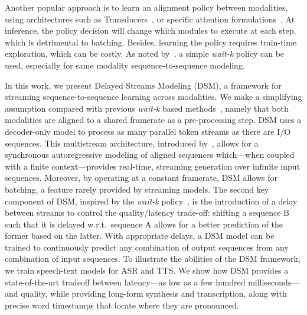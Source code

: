 \documentclass{article}
\begin{document}
Another popular approach is to learn an alignment policy between modalities, using architectures such as Transducers~\citep{graves2012sequence,zhang2020transformer}, or specific attention formulations~\citep{monotonic_attention,guo2024decoder}. 
At inference, the policy decision will change which modules to execute at each step, which is detrimental to batching. Besides, learning the policy requires train-time exploration, which can be costly. As noted by~\citet{ma-etal-2019-stacl}, a simple \emph{wait-k} policy can be used, especially for same modality sequence-to-sequence modeling.

In this work, we present Delayed Streams Modeling (DSM), a framework for streaming sequence-to-sequence learning across modalities. We make a simplifying assumption compared with previous \emph{wait-k} based methods~\citep{ma2021streaming,chen-etal-2021-direct}, namely that both modalities are aligned to a shared framerate as a pre-processing step.
DSM uses a decoder-only model to process as many parallel token streams as there are I/O sequences. This multistream architecture, introduced by~\citet{moshi}, allows for a synchronous autoregressive modeling of aligned sequences which---when coupled with a finite context---provides real-time, streaming generation over infinite input sequences. Moreover, by operating at a constant framerate, DSM allows for batching, a feature rarely provided by streaming models. The second key component of DSM, inspired by the \emph{wait-k} policy~\citep{ma-etal-2019-stacl}, is the introduction of a delay between streams to control the quality/latency trade-off: shifting a sequence B such that it is delayed w.r.t.\ sequence A allows for a better prediction of the former based on the latter. With appropriate delays, a DSM model can be trained to continuously predict any combination of output sequences from any combination of input sequences. 
To illustrate the abilities of the DSM framework, we train speech-text models for ASR and TTS. We show how DSM provides a state-of-the-art tradeoff between latency---as low as a few hundred milliseconds---and quality, while providing long-form synthesis and transcription, along with precise word timestamps that locate where they are pronounced.
\end{document}
